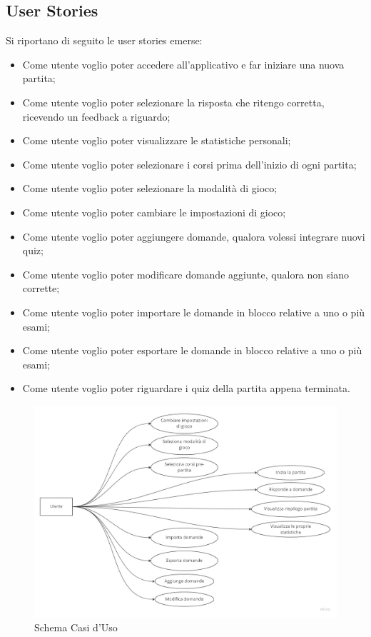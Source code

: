         \subsection{User Stories}
        \label{chap:UserStories}
        Si riportano di seguito le user stories emerse:
        \begin{itemize}
            \item Come utente voglio poter accedere all'applicativo e far iniziare una nuova partita;
            \item Come utente voglio poter selezionare la risposta che ritengo corretta, ricevendo un feedback a riguardo;
            \item Come utente voglio poter visualizzare le statistiche personali;
            \item Come utente voglio poter selezionare i corsi prima dell'inizio di ogni partita;
            \item Come utente voglio poter selezionare la modalità di gioco;
            \item Come utente voglio poter cambiare le impostazioni di gioco;
            \item Come utente voglio poter aggiungere domande, qualora volessi integrare nuovi quiz;
            \item Come utente voglio poter modificare domande aggiunte, qualora non siano corrette;
            \item Come utente voglio poter importare le domande in blocco relative a uno o più esami;
            \item Come utente voglio poter esportare le domande in blocco relative a uno o più esami;
            \item Come utente voglio poter riguardare i quiz della partita appena terminata.
        \end{itemize}
        
        \begin{figure}[H]
            \centering
            \includegraphics[width=\textwidth]{Miro/use-case.jpg}
            \caption{Schema Casi d'Uso}
            \label{fig:use-case}
        \end{figure}

